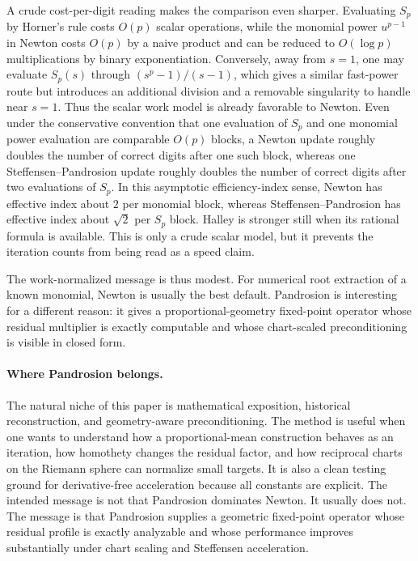 \documentclass[10pt,a4paper]{article}
\theoremstyle{plain}
\theoremstyle{definition}
\theoremstyle{remark}
\begin{document}
A crude cost-per-digit reading makes the comparison even sharper.  Evaluating
$S_p$ by Horner's rule costs $O(p)$ scalar operations, while the monomial power
$u^{p-1}$ in Newton costs $O(p)$ by a naive product and can be reduced to
$O(\log p)$ multiplications by binary exponentiation.  Conversely, away from
$s=1$, one may evaluate $S_p(s)$ through $(s^p-1)/(s-1)$, which gives a similar
fast-power route but introduces an additional division and a removable
singularity to handle near $s=1$.  Thus the scalar work model is already
favorable to Newton.  Even under the conservative convention that one evaluation
of $S_p$ and one monomial power evaluation are comparable $O(p)$ blocks, a
Newton update roughly doubles the number of correct digits
after one such block, whereas one Steffensen--Pandrosion update roughly doubles
the number of correct digits after two evaluations of $S_p$.  In this
asymptotic efficiency-index sense, Newton has effective index about $2$ per
monomial block, whereas Steffensen--Pandrosion has effective index about
$\sqrt2$ per $S_p$ block.  Halley is stronger still when its rational formula is
available.  This is only a crude scalar model, but it prevents the iteration
counts from being read as a speed claim.

The work-normalized message is thus modest.  For numerical root extraction of a
known monomial, Newton is usually the best default.  Pandrosion is interesting
for a different reason: it gives a proportional-geometry fixed-point operator
whose residual multiplier is exactly computable and whose chart-scaled
preconditioning is visible in closed form.

\paragraph{Where Pandrosion belongs.}
The natural niche of this paper is mathematical exposition, historical
reconstruction, and geometry-aware preconditioning.  The method is useful when
one wants to understand how a proportional-mean construction behaves as an
iteration, how homothety changes the residual factor, and how reciprocal charts
on the Riemann sphere can normalize small targets.  It is also a clean testing
ground for derivative-free acceleration because all constants are explicit.
The intended message is not that Pandrosion dominates Newton.  It usually does
not.  The message is that Pandrosion supplies a geometric fixed-point operator
whose residual profile is exactly analyzable and whose performance improves
substantially under chart scaling and Steffensen acceleration.
\end{document}
